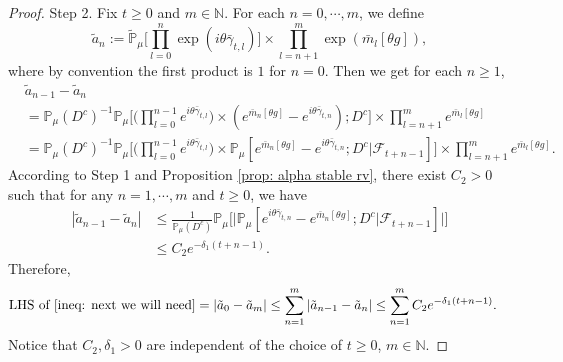 \documentclass[12pt,a4paper]{amsart}
\theoremstyle{plain}
\theoremstyle{definition}
\numberwithin{equation}{section}
\begin{document}
\begin{proof}
    Step 2.
    Fix $t\geq 0$ and $m\in \mathbb{N}$.
    For each $n=0,\cdots,m$, we define
\[
    \tilde{a}_n
    :=\mathbb{\tilde{P}}_{\mu}\Big[\prod_{l=0}^{n}\exp(i\theta\bar{\gamma}_{t,l})\Big] \times \prod_{l=n+1}^{m}\exp(\bar{m}_l[\theta g]),
\] 
    where by convention the first product is $1$ for $n=0$. Then we get for each $n \ge 1$,
\begin{align}
    &\tilde{a}_{n-1} - \tilde{a}_n
    \\&=\mathbb{P}_{\mu}(D^c)^{-1}\mathbb{P}_{\mu}\Big[\Big(\prod_{l=0}^{n-1}e^{i\theta\bar{\gamma}_{t,l}}\Big)\times (e^{\bar{m}_n[\theta g]}-e^{i\theta \bar{\gamma}_{t,n}});D^c\Big] \times \prod_{l=n+1}^{m}e^{\bar{m}_l[\theta g]}
    \\&=\mathbb{P}_{\mu}(D^c)^{-1}\mathbb{P}_{\mu}\Big[\Big(\prod_{l=0}^{n-1}e^{i\theta\bar{\gamma}_{t,l}}\Big)\times \mathbb{P}_{\mu}[e^{\bar{m}_n[\theta g]}-e^{i\theta \bar{\gamma}_{t,n}};D^c|\mathscr{F}_{t+n-1}]\Big]\times \prod_{l=n+1}^{m}e^{\bar{m}_l[\theta g]}.
\end{align}
    According to Step 1 and Proposition \ref{prop: alpha stable rv},
    there exist $C_2>0$ such that for any $n=1,\cdots, m$ and $t\geq0$, we have
\begin{align}
    |\tilde{a}_{n-1}- \tilde{a}_n|
    &\leq \frac{1}{\mathbb{P}_{\mu}(D^c)}\mathbb{P}_{\mu}\Big[\big|\mathbb P_\mu[e^{i\theta\bar{\gamma}_{t,n}}-e^{\bar{m}_n[\theta g]}; D^c\big|\mathscr{F}_{t+n-1}]\big|\Big]
    \\& \leq C_2 e^{-\delta_1(t+n-1)}.
\end{align}
    Therefore,
\begin{align}
    \text{LHS of \eqref{ineq: next we will need}}
    &= \left|\tilde{a}_{0}-\tilde{a}_m\right|
    \leq\sum_{n=1}^m\left|\tilde{a}_{n-1}-\tilde{a}_n\right|
    \leq \sum_{n=1}^m C_2 e^{-\delta_1(t+n-1)}.
\end{align}
	Notice that $C_2, \delta_1>0$ are independent of the choice of $t\geq 0$, $m\in \mathbb{N}$.
\end{proof}
\end{document}
